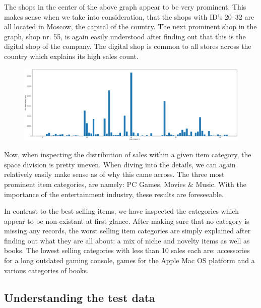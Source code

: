 The shops in the center of the above graph appear to be very prominent. This makes sense when we take into consideration, that the shops with ID's 20--32 are all located in Moscow, the capital of the country.
The next prominent shop in the graph, shop nr. 55, is again easily understood after finding out that this is the digital shop of the company. The digital shop is common to all stores across the country which explains its high sales count.

\begin{figure}[h]
  \centering
  \includegraphics[width=0.98\linewidth]{external_content/graphs/distribution_across_item_categories.png}
  \captionsetup{justification=centering}
  \label{fig:distribution_amongst_item_categories}
\end{figure}

Now, when inspecting the distribution of sales within a given item category, the space division is pretty uneven. When diving into the details, we can again relatively easily make sense as of why this came across.
The three most prominent item categories, are namely: PC Games, Movies \& Music. With the importance of the entertainment industry, these results are foreseeable.

In contrast to the best selling items, we have inspected the categories which appear to be non-existant at first glance. After making sure that no category is missing any records, the worst selling item categories are simply explained after finding out what they are all about: a mix of niche and novelty items as well as books. The lowest selling categories with less than 10 sales each are: accessories for a long outdated gaming console, games for the Apple Mac OS platform and a various categories of books.

\subsection{Understanding the test data}

